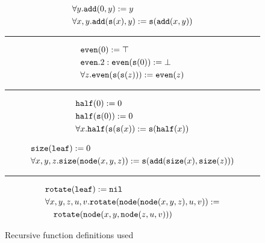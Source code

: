 
\begin{figure}
\footnotesize
\begin{minipage}[t]{0.4\textwidth}
$$\begin{aligned}&\forall y.\mathtt{add}(0,y):=y\\
&\forall x,y.\mathtt{add}(\mathtt{s}(x),y):=\mathtt{s}(\mathtt{add}(x,y))\\
\end{aligned}$$
\hrule
$$\begin{aligned}&\mathtt{even}(0):=\top\\
&\mathtt{even}.2:\mathtt{even}(\mathtt{s}(0)):=\bot\\
&\forall z.\mathtt{even}(\mathtt{s}(\mathtt{s}(z))):=\mathtt{even}(z)\\
\end{aligned}$$
\hrule
$$\begin{aligned}&\mathtt{half}(0):=0\\
&\mathtt{half}(\mathtt{s}(0)):=0\\
&\forall x.\mathtt{half}(\mathtt{s}(\mathtt{s}(x)):=\mathtt{s}(\mathtt{half}(x))\\
\end{aligned}$$\end{minipage}
\begin{minipage}[t]{0.5\textwidth}
$$\begin{aligned}&\mathtt{size}(\mathtt{leaf}):=0\\
&\forall x,y,z.\mathtt{size}(\mathtt{node}(x,y,z)):=\mathtt{s}(\mathtt{add}(\mathtt{size}(x),\mathtt{size}(z)))\\
\end{aligned}$$
\hrule
$$\begin{aligned}
&\mathtt{rotate}(\mathtt{leaf}):=\mathtt{nil}\\
&\forall x,y,z,u,v.\mathtt{rotate}(\mathtt{node}(\mathtt{node}(x,y,z),u,v)):=\\&\quad\mathtt{rotate}(\mathtt{node}(x,y,\mathtt{node}(z,u,v)))
\end{aligned}$$
\end{minipage}
\caption{Recursive function definitions used}
\label{fig:functions}
\end{figure}
\normalsize

